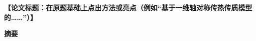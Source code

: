 \documentclass[12pt,a4paper]{article}
\newcommand{\ph}[1]{\textbf{【#1】}}                                   %
\begin{document}


\setcounter{page}{1}

\begin{center}
{\bfseries \ph{论文标题：在原题基础上点出方法或亮点（例如“基于一维轴对称传热传质模型的……”）}}

\vspace{2ex}
{\bfseries 摘\quad 要}
\end{center}
\end{document}

